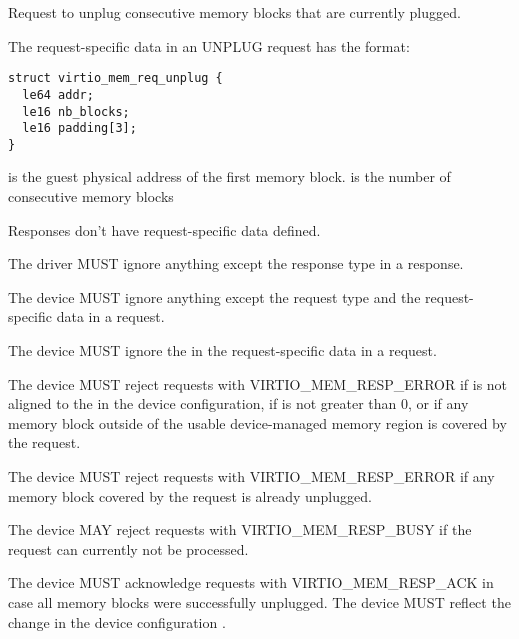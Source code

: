 Request to unplug consecutive memory blocks that are currently plugged.

The request-specific data in an UNPLUG request has the format:

\begin{lstlisting}
struct virtio_mem_req_unplug {
  le64 addr;
  le16 nb_blocks;
  le16 padding[3];
}
\end{lstlisting}

 is the guest physical address of the first memory block.
 is the number of consecutive memory blocks

Responses don't have request-specific data defined.


The driver MUST ignore anything except the response type in a response.


The device MUST ignore anything except the request type and the
request-specific data in a request.

The device MUST ignore the  in the request-specific data in
a request.

The device MUST reject requests with VIRTIO_MEM_RESP_ERROR if 
is not aligned to the  in the device configuration, if
 is not greater than 0, or if any memory block outside of
the usable device-managed memory region is covered by the request.

The device MUST reject requests with VIRTIO_MEM_RESP_ERROR if any memory
block covered by the request is already unplugged.

The device MAY reject requests with VIRTIO_MEM_RESP_BUSY if the request can
currently not be processed.

The device MUST acknowledge requests with VIRTIO_MEM_RESP_ACK in case all
memory blocks were successfully unplugged.  The device MUST reflect the
change in the device configuration .

